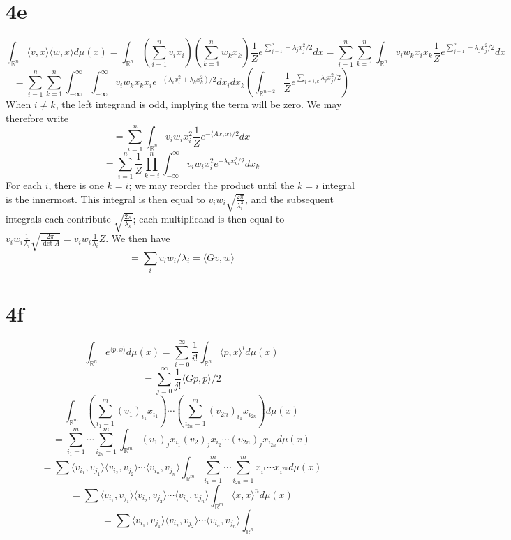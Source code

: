 \documentclass{article}
\begin{document}
\section*{4e}
\[
  \int_{\mathbb{R}^{n}}\langle v,x \rangle\langle w,x \rangle d\mu(x)
  =\int_{\mathbb{R}^{n}}\left( \sum_{i=1}^{n}v_{i}x_{i} \right)\left( \sum_{k=1}^{n}w_{k}x_{k} \right)
  \frac{1}{Z}e^{\sum_{j=1}^{n}-\lambda_{j}x_{j}^{2}/2}dx
  =\sum_{i=1}^{n}\sum_{k=1}^{n}\int_{\mathbb{R}^{n}}v_{i}w_{k}x_{i}x_{k}  \frac{1}{Z}e^{\sum_{j=1}^{n}-\lambda_{j}x_{j}^{2}/2}dx
\]
\[
  =\sum_{i=1}^{n}\sum_{k=1}^{n}\int_{-\infty}^{\infty}\int_{-\infty}^{\infty}v_{i}w_{k}x_{k}x_{i}e^{-(\lambda_{i} x_{i}^{2}+\lambda_{k}x_k^2)/2}dx_{i}dx_{k}
  \left( \int_{\mathbb{R}^{n-2}}\frac{1}{Z}e^{\sum_{j\neq i,k}\lambda_{j}x_{j}^{2}/2} \right)
\]
When $i\neq k$, the left integrand is odd, implying the term will be zero.
We may therefore write
\[
  =\sum_{i=1}^{n}\int_{\mathbb{R}^{n}}v_{i}w_{i}x_{i}^{2}\frac{1}{Z}e^{-\langle Ax,x \rangle/2}dx
\]
\[
  =\sum_{i=1}^{n}\frac{1}{Z}\prod_{k=i}^{n}\int_{-\infty}^{\infty}v_{i}w_{i}x_{i}^{2}e^{-\lambda_{k}x_{k}^{2}/2}dx_{k}
\]
For each $i$, there is one $k=i$; we may reorder the product until the $k=i$ integral is the innermost. This integral is then equal to
$v_{i}w_{i}\sqrt{\frac{2\pi}{\lambda_{i}^{3}}}$, and the subsequent integrals each contribute $\sqrt{\frac{2\pi}{\lambda_{k}}}$;
each multiplicand is then equal to $v_{i}w_{i}\frac{1}{\lambda_{i}}\sqrt{\frac{2\pi}{\det A}}=v_{i}w_{i}\frac{1}{\lambda_{i}}Z$.
We then have
\[
  =\sum_{i}v_{i}w_{i}/\lambda_{i} = \langle Gv,w \rangle
\]

\section*{4f} %
\[
  \int_{\mathbb{R}^{n}}e^{\langle p,x \rangle}d\mu(x)=\sum_{i=0}^{\infty}\frac{1}{i!}\int_{\mathbb{R}^{n}}\langle p,x \rangle^{i}d\mu(x)
\]
\[
  =\sum_{j=0}^{\infty}\frac{1}{j!}\langle Gp,p \rangle/2
\]
\[
  \int_{\mathbb{R}^{m}}\left( \sum_{i_{1}=1}^{m}(v_{1})_{i_{1}}x_{i_{1}}\right)\cdots\left( \sum_{i_{2n}=1}^{m}(v_{2n})_{i_{1}}x_{i_{2n}} \right)d\mu(x)
\]
\[
  =\sum_{i_{1}=1}^{m}\cdots\sum_{i_{2n}=1}^{m}\int_{\mathbb{R}^{m}}(v_{1})_{j}x_{i_{1}}(v_{2})_{j}x_{i_{2}}\cdots (v_{2n})_{j}x_{i_{2n}}d\mu(x)
\]
\[
  =\sum\langle v_{i_{1}},v_{j_{1}}  \rangle\langle v_{i_{2}},v_{j_{2}} \rangle\cdots \langle v_{i_{n}},v_{j_{n}} \rangle
  \int_{\mathbb{R}^{m}}\sum_{i_{1}=1}^{m}\cdots \sum_{i_{2n}=1}^{m}x_{i^{1}}\cdots x_{i^{2n}}d\mu(x)
\]
\[
  =\sum\langle v_{i_{1}},v_{j_{1}}  \rangle\langle v_{i_{2}},v_{j_{2}} \rangle\cdots \langle v_{i_{n}},v_{j_{n}} \rangle
  \int_{\mathbb{R}^{m}}\langle x,x \rangle^{n} d\mu(x)
\]
\[
  =\sum\langle v_{i_{1}},v_{j_{1}}  \rangle\langle v_{i_{2}},v_{j_{2}} \rangle\cdots \langle v_{i_{n}},v_{j_{n}} \rangle
  \int_{\mathbb{R}^{n}}
\]
\end{document}

